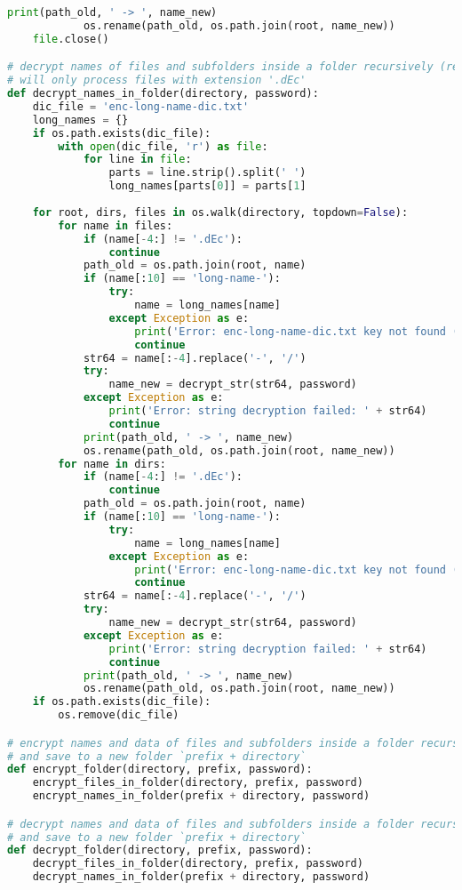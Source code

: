 \begin{lstlisting}[language=python,caption=encrypt.py]
			print(path_old, ' -> ', name_new)
			os.rename(path_old, os.path.join(root, name_new))
	file.close()

# decrypt names of files and subfolders inside a folder recursively (rename)
# will only process files with extension '.dEc'
def decrypt_names_in_folder(directory, password):
	dic_file = 'enc-long-name-dic.txt'
	long_names = {}
	if os.path.exists(dic_file):
		with open(dic_file, 'r') as file:
			for line in file:
				parts = line.strip().split(' ')
				long_names[parts[0]] = parts[1]
				
	for root, dirs, files in os.walk(directory, topdown=False):
		for name in files:
			if (name[-4:] != '.dEc'):
			 	continue
			path_old = os.path.join(root, name)
			if (name[:10] == 'long-name-'):
				try:
					name = long_names[name]
				except Exception as e:
					print('Error: enc-long-name-dic.txt key not found (will skip): ' + name)
					continue
			str64 = name[:-4].replace('-', '/')
			try:
				name_new = decrypt_str(str64, password)
			except Exception as e:
				print('Error: string decryption failed: ' + str64)
				continue
			print(path_old, ' -> ', name_new)
			os.rename(path_old, os.path.join(root, name_new))
		for name in dirs:
			if (name[-4:] != '.dEc'):
			 	continue
			path_old = os.path.join(root, name)
			if (name[:10] == 'long-name-'):
				try:
					name = long_names[name]
				except Exception as e:
					print('Error: enc-long-name-dic.txt key not found (will skip): ' + name)
					continue
			str64 = name[:-4].replace('-', '/')
			try:
				name_new = decrypt_str(str64, password)
			except Exception as e:
				print('Error: string decryption failed: ' + str64)
				continue
			print(path_old, ' -> ', name_new)
			os.rename(path_old, os.path.join(root, name_new))
	if os.path.exists(dic_file):
    	os.remove(dic_file)

# encrypt names and data of files and subfolders inside a folder recursively
# and save to a new folder `prefix + directory`
def encrypt_folder(directory, prefix, password):
	encrypt_files_in_folder(directory, prefix, password)
	encrypt_names_in_folder(prefix + directory, password)

# decrypt names and data of files and subfolders inside a folder recursively
# and save to a new folder `prefix + directory`
def decrypt_folder(directory, prefix, password):
	decrypt_files_in_folder(directory, prefix, password)
	decrypt_names_in_folder(prefix + directory, password)
\end{lstlisting}
